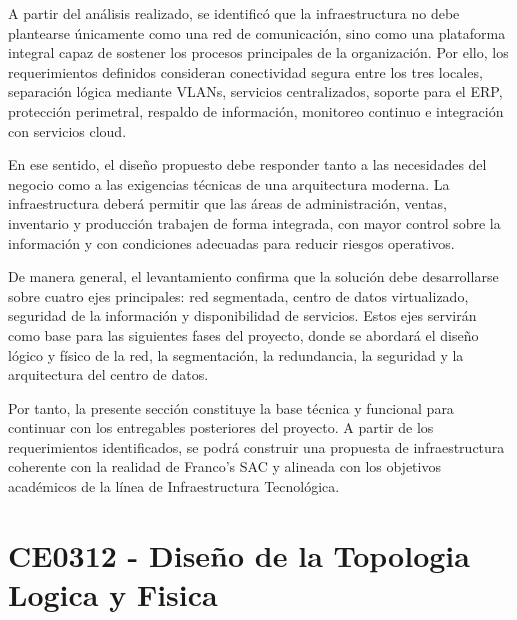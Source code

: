 \documentclass[11pt, a4paper, oneside]{report}
\begin{document}
A partir del análisis realizado, se identificó que la infraestructura no debe plantearse únicamente como una red de comunicación, sino como una plataforma integral capaz de sostener los procesos principales de la organización. Por ello, los requerimientos definidos consideran conectividad segura entre los tres locales, separación lógica mediante VLANs, servicios centralizados, soporte para el ERP, protección perimetral, respaldo de información, monitoreo continuo e integración con servicios cloud.

En ese sentido, el diseño propuesto debe responder tanto a las necesidades del negocio como a las exigencias técnicas de una arquitectura moderna. La infraestructura deberá permitir que las áreas de administración, ventas, inventario y producción trabajen de forma integrada, con mayor control sobre la información y con condiciones adecuadas para reducir riesgos operativos.

De manera general, el levantamiento confirma que la solución debe desarrollarse sobre cuatro ejes principales: red segmentada, centro de datos virtualizado, seguridad de la información y disponibilidad de servicios. Estos ejes servirán como base para las siguientes fases del proyecto, donde se abordará el diseño lógico y físico de la red, la segmentación, la redundancia, la seguridad y la arquitectura del centro de datos.

Por tanto, la presente sección constituye la base técnica y funcional para continuar con los entregables posteriores del proyecto. A partir de los requerimientos identificados, se podrá construir una propuesta de infraestructura coherente con la realidad de Franco's SAC y alineada con los objetivos académicos de la línea de Infraestructura Tecnológica.

\chapter{CE0312 - Diseño de la Topologia Logica y Fisica}
\end{document}

